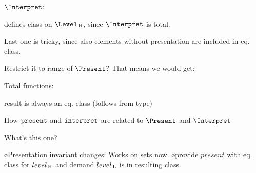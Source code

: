 $\Interpret$:


defines class on $\Level\H$, since $\Interpret$ is total.

Last one is tricky, since also elements without presentation are included in eq. class.

Restrict it to range of $\Present$?
That means we would get:


\textuparrow\textuparrow\textuparrow\textuparrow

Total functions:


result is always an eq. class (follows from type)


How ${\tt present}$ and ${\tt interpret}$ are related to $\Present$ and $\Interpret$


What's this one?


\bl
\o Presentation invariant changes: Works on sets now.
\o provide $present$ with eq. class for $level_{\, \mathrm H}$ and demand $level_{\, \mathrm L}$ is in resulting class.
\el



